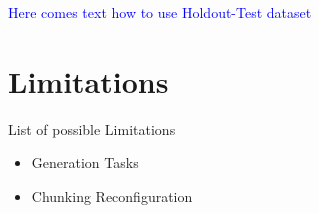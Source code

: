\textcolor{blue}{Here comes text how to use Holdout-Test dataset}



\section{Limitations}

List of possible Limitations

\begin{itemize}
    \item Generation Tasks 
    \item Chunking Reconfiguration
\end{itemize}




